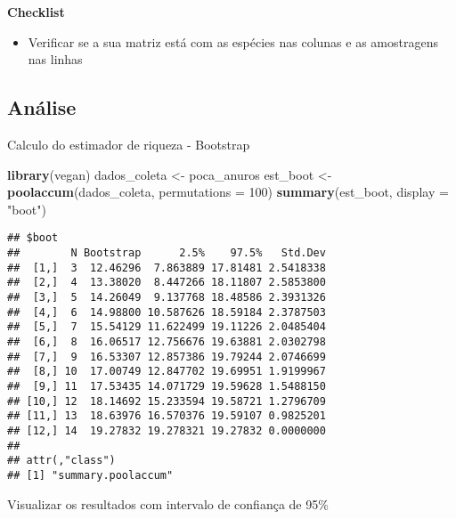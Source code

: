 \documentclass[
]{book}
\newenvironment{Shaded}{\begin{snugshade}}{\end{snugshade}}
\newcommand{\DataTypeTok}[1]{\textcolor[rgb]{0.13,0.29,0.53}{#1}}
\newcommand{\DecValTok}[1]{\textcolor[rgb]{0.00,0.00,0.81}{#1}}
\newcommand{\KeywordTok}[1]{\textcolor[rgb]{0.13,0.29,0.53}{\textbf{#1}}}
\newcommand{\NormalTok}[1]{#1}
\newcommand{\StringTok}[1]{\textcolor[rgb]{0.31,0.60,0.02}{#1}}
\providecommand{\tightlist}{%
  \setlength{\itemsep}{0pt}\setlength{\parskip}{0pt}}
\begin{document}
\textbf{Checklist}

\begin{itemize}
\tightlist
\item
  Verificar se a sua matriz está com as espécies nas colunas e as amostragens nas linhas
\end{itemize}

\hypertarget{anuxe1lise-5}{%
\subsection{Análise}\label{anuxe1lise-5}}

Calculo do estimador de riqueza - Bootstrap

\begin{Shaded}
\begin{Highlighting}[]
\KeywordTok{library}\NormalTok{(vegan)}
\NormalTok{dados_coleta <-}\StringTok{ }\NormalTok{poca_anuros}
\NormalTok{est_boot <-}\StringTok{ }\KeywordTok{poolaccum}\NormalTok{(dados_coleta, }\DataTypeTok{permutations =} \DecValTok{100}\NormalTok{)}
\KeywordTok{summary}\NormalTok{(est_boot, }\DataTypeTok{display =} \StringTok{"boot"}\NormalTok{)}
\end{Highlighting}
\end{Shaded}

\begin{verbatim}
## $boot
##        N Bootstrap      2.5%    97.5%   Std.Dev
##  [1,]  3  12.46296  7.863889 17.81481 2.5418338
##  [2,]  4  13.38020  8.447266 18.11807 2.5853800
##  [3,]  5  14.26049  9.137768 18.48586 2.3931326
##  [4,]  6  14.98800 10.587626 18.59184 2.3787503
##  [5,]  7  15.54129 11.622499 19.11226 2.0485404
##  [6,]  8  16.06517 12.756676 19.63881 2.0302798
##  [7,]  9  16.53307 12.857386 19.79244 2.0746699
##  [8,] 10  17.00749 12.847702 19.69951 1.9199967
##  [9,] 11  17.53435 14.071729 19.59628 1.5488150
## [10,] 12  18.14692 15.233594 19.58721 1.2796709
## [11,] 13  18.63976 16.570376 19.59107 0.9825201
## [12,] 14  19.27832 19.278321 19.27832 0.0000000
## 
## attr(,"class")
## [1] "summary.poolaccum"
\end{verbatim}

Visualizar os resultados com intervalo de confiança de 95\%
\end{document}
